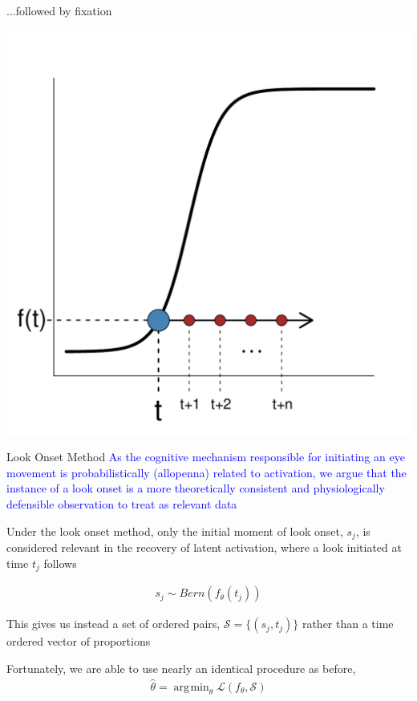 \documentclass{beamer}
\DeclareMathOperator*{\argmin}{arg\!\min}
\newcommand{\vp}{\vspace{2mm}}
\providecommand{\cn}[1]{\textcolor{blue}{#1}}
\begin{document}
\begin{frame}{...followed by fixation}
\vspace{-5mm}
\begin{center}
\includegraphics[scale=0.4]{img/logistic_c.pdf}
\end{center}
\end{frame}


\begin{frame}{Look Onset Method}
\cn{As the cognitive mechanism responsible for initiating an eye movement is probabilistically (allopenna) related to activation, we argue that the instance of a look onset is a more theoretically consistent and physiologically defensible observation to treat as relevant data} \vp

Under the look onset method, only the initial moment of look onset, $s_j$, is considered relevant in the recovery of latent activation, where a look initiated at time $t_j$ follows

\begin{align*}
s_j \sim Bern(f_{\theta}(t_j))
\end{align*}

This gives us instead a set of ordered pairs, $\mathcal{S} = \{(s_j, t_j)\}$ rather than a time ordered vector of proportions \\ \vp

Fortunately, we are able to use nearly an identical procedure as before, 
\begin{align*}
\hat{\theta} = \argmin_{\theta} \mathcal{L}(f_{\theta}, \mathcal{S})
\end{align*}
\end{frame}
\end{document}
